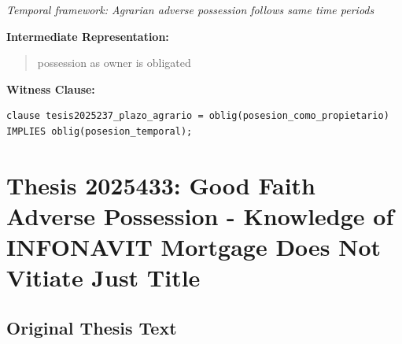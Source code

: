 \documentclass[11pt,a4paper]{article}
\begin{document}
\textit{Temporal framework: Agrarian adverse possession follows same time periods}

\textbf{Intermediate Representation:}

\begin{quote}
possession as owner is obligated
\end{quote}

\textbf{Witness Clause:}

\begin{lstlisting}[style=witnessstyle, language=Witness]
clause tesis2025237_plazo_agrario = oblig(posesion_como_propietario) IMPLIES oblig(posesion_temporal);
\end{lstlisting}

\newpage

\section{Thesis 2025433: Good Faith Adverse Possession - Knowledge of INFONAVIT Mortgage Does Not Vitiate Just Title}
\label{thesis:2025433}

\subsection{Original Thesis Text}
\end{document}
